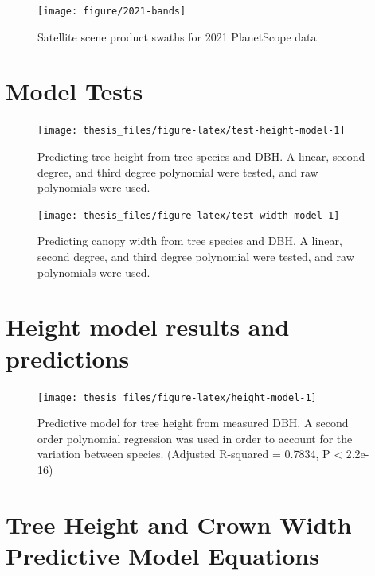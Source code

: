 \documentclass[12pt,twoside]{reedthesis}
\begin{document}
\begin{figure}

{\centering \texttt{[image: figure/2021-bands]} 

}

\caption{Satellite scene product swaths for 2021 PlanetScope data}\label{fig:2021-swath}
\end{figure}
\hypertarget{model-tests}{%
\section*{Model Tests}\label{model-tests}}
\begin{figure}

{\centering \texttt{[image: thesis\_files/figure-latex/test-height-model-1]} 

}

\caption[Model tests for tree height predictions]{Predicting tree height from tree species and DBH. A linear, second degree, and third degree polynomial were tested, and raw polynomials were used.}\label{fig:test-height-model}
\end{figure}
\begin{figure}

{\centering \texttt{[image: thesis\_files/figure-latex/test-width-model-1]} 

}

\caption[Model tests for tree canopy width predictions]{Predicting canopy width from tree species and DBH. A linear, second degree, and third degree polynomial were tested, and raw polynomials were used.}\label{fig:test-width-model}
\end{figure}
\hypertarget{height-model-results-and-predictions}{%
\section*{Height model results and predictions}\label{height-model-results-and-predictions}}
\begin{figure}

{\centering \texttt{[image: thesis\_files/figure-latex/height-model-1]} 

}

\caption[Tree height predictive model]{Predictive model for tree height from measured DBH. A second order polynomial regression was used in order to account for the variation between species. (Adjusted R-squared = 0.7834, P < 2.2e-16)}\label{fig:height-model}
\end{figure}
\hypertarget{tree-height-and-crown-width-predictive-model-equations}{%
\section*{Tree Height and Crown Width Predictive Model Equations}\label{tree-height-and-crown-width-predictive-model-equations}}
\end{document}

